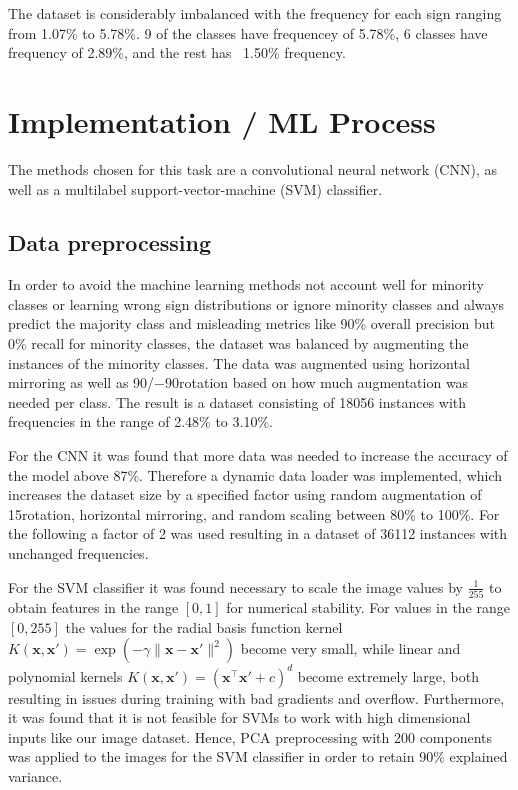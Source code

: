 \documentclass[a4, 10 pt, conference]{ieeeconf}  %
\begin{document}
The dataset is considerably imbalanced with the frequency for each sign ranging from
1.07\% to 5.78\%. 9 of the classes have frequencey of 5.78\%, 6 classes have 
frequency of 2.89\%, and the rest has ~1.50\% frequency.

\section{Implementation / ML Process}
\label{sec:methods}

The methods chosen for this task are a convolutional neural network (CNN), as
well as a multilabel support-vector-machine (SVM) classifier.

\subsection{Data preprocessing}
\label{subsec:preprocessing}

In order to avoid the machine learning methods not account well for minority classes or
learning wrong sign distributions or ignore minority classes and always predict the majority class
and misleading metrics like 90\% overall precision but 0\% recall for minority classes, 
the dataset was balanced by augmenting the instances of the minority classes.
The data was augmented using horizontal mirroring as well as 90\textdegree/$-90$\textdegree rotation based 
on how much augmentation was needed per class. The result is a dataset consisting
of 18056 instances with frequencies in the range of 2.48\% to 3.10\%. 

For the CNN it was found that more data was needed to increase the accuracy of the model
above 87\%. Therefore a dynamic data loader was implemented, which increases the 
dataset size by a specified factor using random augmentation of 15\textdegree rotation, 
horizontal mirroring, and random scaling between 80\% to 100\%. For the following 
a factor of 2 was used resulting in a dataset of 36112 instances with unchanged frequencies.

For the SVM classifier it was found necessary to scale the image values by $\frac{1}{255}$
to obtain features in the range $[0,1]$ for numerical stability. For values in the range $[0,255]$
the values for the radial basis function kernel $K(\mathbf{x}, \mathbf{x}') = \exp\left(-\gamma \|\mathbf{x} - \mathbf{x}'\|^2\right)$
 become very small, while linear and polynomial kernels $K(\mathbf{x}, \mathbf{x}') = \left(\mathbf{x}^\top \mathbf{x}' + c\right)^d$ become
extremely large, both resulting in issues during training with bad gradients and overflow.
Furthermore, it was found that it is not feasible for SVMs to work with high dimensional inputs
like our image dataset. Hence, PCA preprocessing with 200 components was applied to the images for the 
SVM classifier in order to retain 90\% explained variance.
\end{document}
